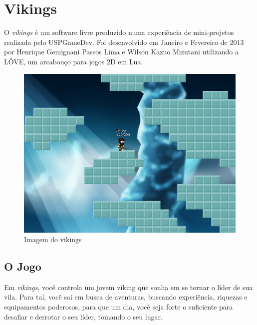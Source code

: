 \section{Vikings}
\label{sec:conceitos:vikings}
  O \textit{vikings}\footnotemark{} é um software livre produzido numa experiência de mini-projetos realizada pelo USPGameDev\footnotemark. 
  Foi desenvolvido em Janeiro e Fevereiro de 2013 por Henrique Gemignani Passos Lima e Wilson Kazuo Mizutani 
  utilizando a LÖVE, um arcabouço para jogos 2D em Lua\footnotemark{}.
  
  \begin{figure}
    \includegraphics{imagens/vikings-1.png}
    \caption{Imagem do vikings}
  \end{figure}
  
  \addtocounter{footnote}{-3}


  \subsection{O Jogo}
    Em \textit{vikings}, você controla um jovem viking que sonha em se tornar o líder de sua vila. Para tal,
    você sai em busca de aventuras, buscando experiência, riquezas e equipamentos poderosos, para que um dia,
    você seja forte o suficiente para desafiar e derrotar o seu líder, tomando o seu lugar.
        
